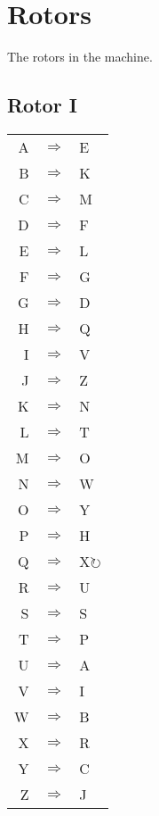 \section{Rotors}

The rotors in the machine.

\begin{multicols}{2}

\subsection{Rotor I}
\begin{supertabular}{rcl}
A & $\Rightarrow$ & E \\
B & $\Rightarrow$ & K \\
C & $\Rightarrow$ & M \\
D & $\Rightarrow$ & F \\
E & $\Rightarrow$ & L \\
F & $\Rightarrow$ & G \\
G & $\Rightarrow$ & D \\
H & $\Rightarrow$ & Q \\
I & $\Rightarrow$ & V \\
J & $\Rightarrow$ & Z \\
K & $\Rightarrow$ & N \\
L & $\Rightarrow$ & T \\
M & $\Rightarrow$ & O \\
N & $\Rightarrow$ & W \\
O & $\Rightarrow$ & Y \\
P & $\Rightarrow$ & H \\
Q & $\Rightarrow$ & X$\circlearrowright$ \\
R & $\Rightarrow$ & U \\
S & $\Rightarrow$ & S \\
T & $\Rightarrow$ & P \\
U & $\Rightarrow$ & A \\
V & $\Rightarrow$ & I \\
W & $\Rightarrow$ & B \\
X & $\Rightarrow$ & R \\
Y & $\Rightarrow$ & C \\
Z & $\Rightarrow$ & J \\
\end{supertabular}


\end{multicols}
